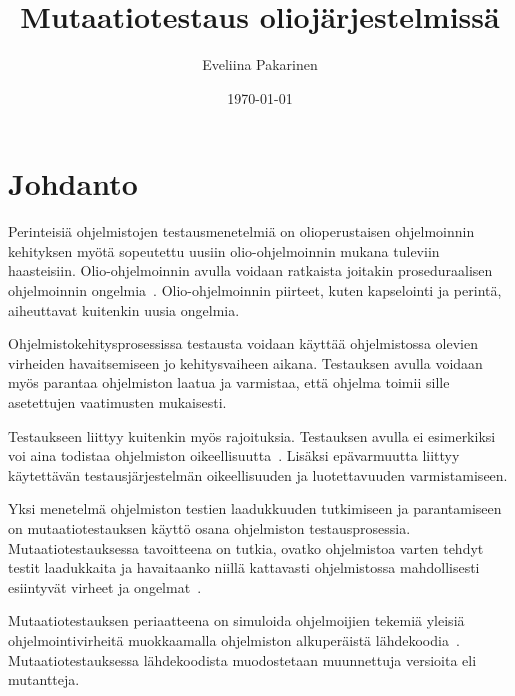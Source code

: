 \documentclass[finnish, grading]{tktltiki2}
\title{Mutaatiotestaus oliojärjestelmissä}
\author{Eveliina Pakarinen}
\date{\today}
\theoremstyle{definition}
\theoremstyle{remark}
\begin{document}

\frontmatter      %

\maketitle        %
\makeabstract     %

\tableofcontents  %


\mainmatter       %




\section{Johdanto}

Perinteisiä ohjelmistojen testausmenetelmiä on olioperustaisen ohjelmoinnin kehityksen myötä sopeutettu uusiin olio-ohjelmoinnin mukana tuleviin haasteisiin. Olio-ohjelmoinnin avulla voidaan ratkaista joitakin proseduraalisen ohjelmoinnin ongelmia~\cite[s. 86]{Mariani:Pezze:2008}. Olio-ohjelmoinnin piirteet, kuten kapselointi ja perintä, aiheuttavat kuitenkin uusia ongelmia.

Ohjelmistokehitysprosessissa testausta voidaan käyttää ohjelmistossa olevien virheiden havaitsemiseen jo kehitysvaiheen aikana. Testauksen avulla voidaan myös parantaa ohjelmiston laatua ja varmistaa, että ohjelma toimii sille asetettujen vaatimusten mukaisesti. 

Testaukseen liittyy kuitenkin myös rajoituksia. Testauksen avulla ei esimerkiksi voi aina todistaa ohjelmiston oikeellisuutta~\cite[s. 58]{Binder:1999}. Lisäksi epävarmuutta liittyy käytettävän testausjärjestelmän oikeellisuuden ja luotettavuuden varmistamiseen.

Yksi menetelmä ohjelmiston testien laadukkuuden tutkimiseen ja parantamiseen on mutaatiotestauksen käyttö osana ohjelmiston testausprosessia. Mutaatiotestauksessa tavoitteena on tutkia, ovatko ohjelmistoa varten tehdyt testit laadukkaita ja havaitaanko niillä kattavasti ohjelmistossa mahdollisesti esiintyvät virheet ja ongelmat~\cite[s. 649]{Jia:Harman:2011}. 

Mutaatiotestauksen periaatteena on simuloida ohjelmoijien tekemiä yleisiä ohjelmointivirheitä muokkaamalla ohjelmiston alkuperäistä lähdekoodia~\cite[s. 649]{Jia:Harman:2011}. Mutaatiotestauksessa lähdekoodista muodostetaan muunnettuja versioita eli mutantteja. 
\end{document}
